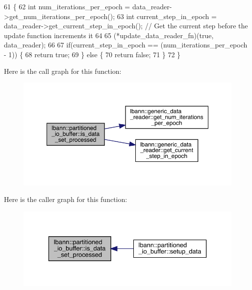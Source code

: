 \begin{DoxyCode}
61                                                                                                            
       \{
62   \textcolor{keywordtype}{int} num\_iterations\_per\_epoch = data\_reader->get\_num\_iterations\_per\_epoch();
63   \textcolor{keywordtype}{int} current\_step\_in\_epoch = data\_reader->get\_current\_step\_in\_epoch(); \textcolor{comment}{// Get the current step before the
       update function increments it}
64 
65   (*update\_data\_reader\_fn)(\textcolor{keyword}{true}, data\_reader);
66 
67   \textcolor{keywordflow}{if}(current\_step\_in\_epoch == (num\_iterations\_per\_epoch - 1)) \{
68     \textcolor{keywordflow}{return} \textcolor{keyword}{true};
69   \} \textcolor{keywordflow}{else} \{
70     \textcolor{keywordflow}{return} \textcolor{keyword}{false};
71   \}
72 \}
\end{DoxyCode}
Here is the call graph for this function\+:\nopagebreak
\begin{figure}[H]
\begin{center}
\leavevmode
\includegraphics[width=350pt]{classlbann_1_1partitioned__io__buffer_a0944161f90eb65286974c3e85155608f_cgraph}
\end{center}
\end{figure}
Here is the caller graph for this function\+:\nopagebreak
\begin{figure}[H]
\begin{center}
\leavevmode
\includegraphics[width=329pt]{classlbann_1_1partitioned__io__buffer_a0944161f90eb65286974c3e85155608f_icgraph}
\end{center}
\end{figure}
\mbox{\label{classlbann_1_1partitioned__io__buffer_a69379e060f2ab7294c55f105f2c8d06c}} 

